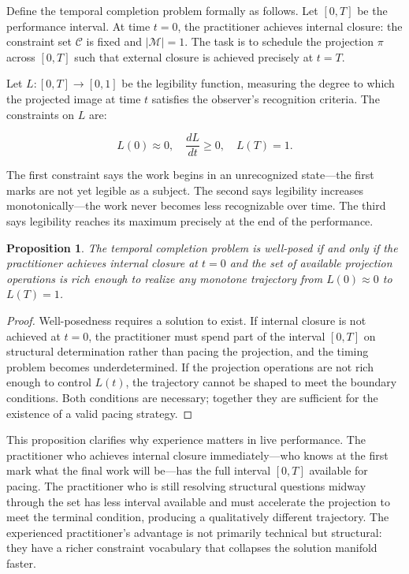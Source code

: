 \documentclass[11pt, twoside]{article}
\theoremstyle{plain}
\newtheorem{proposition}[theorem]{Proposition}
\theoremstyle{definition}
\theoremstyle{remark}
\begin{document}
Define the temporal completion problem formally as follows. Let $[0, T]$ be the performance interval. At time $t = 0$, the practitioner achieves internal closure: the constraint set $\mathcal{C}$ is fixed and $|\mathcal{M}| = 1$. The task is to schedule the projection $\pi$ across $[0, T]$ such that external closure is achieved precisely at $t = T$.

Let $L : [0, T] \to [0, 1]$ be the legibility function, measuring the degree to which the projected image at time $t$ satisfies the observer's recognition criteria. The constraints on $L$ are:

\[
L(0) \approx 0, \quad \frac{dL}{dt} \geq 0, \quad L(T) = 1.
\]

The first constraint says the work begins in an unrecognized state---the first marks are not yet legible as a subject. The second says legibility increases monotonically---the work never becomes less recognizable over time. The third says legibility reaches its maximum precisely at the end of the performance.

\begin{proposition}
\label{prop:temporal-closure}
The temporal completion problem is well-posed if and only if the practitioner achieves internal closure at $t = 0$ and the set of available projection operations is rich enough to realize any monotone trajectory from $L(0) \approx 0$ to $L(T) = 1$.
\end{proposition}

\begin{proof}
Well-posedness requires a solution to exist. If internal closure is not achieved at $t = 0$, the practitioner must spend part of the interval $[0, T]$ on structural determination rather than pacing the projection, and the timing problem becomes underdetermined. If the projection operations are not rich enough to control $L(t)$, the trajectory cannot be shaped to meet the boundary conditions. Both conditions are necessary; together they are sufficient for the existence of a valid pacing strategy.
\end{proof}

This proposition clarifies why experience matters in live performance. The practitioner who achieves internal closure immediately---who knows at the first mark what the final work will be---has the full interval $[0, T]$ available for pacing. The practitioner who is still resolving structural questions midway through the set has less interval available and must accelerate the projection to meet the terminal condition, producing a qualitatively different trajectory. The experienced practitioner's advantage is not primarily technical but structural: they have a richer constraint vocabulary that collapses the solution manifold faster.
\end{document}
